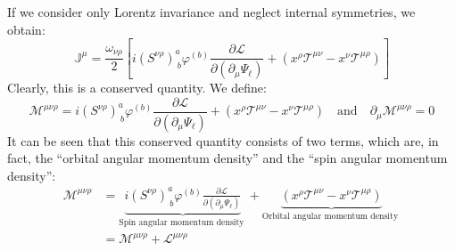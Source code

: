 \noindent
If we consider only Lorentz invariance and neglect internal symmetries, we obtain:
    \begin{equation}
    \mathbb{J}^\mu =
    \frac{\omega_{\nu\rho}}{2} \left[ i (S^{\nu\rho})^{a}_{\ b} \varphi ^{(b)}
    \frac{\partial \mathscr{L}}{\partial (\partial_\mu \Psi_\ell)} +
    \left( x^\rho \mathcal{T}^{\mu\nu} 
    - x^\nu \mathcal{T}^{\mu\rho} \right) \right]
  \end{equation}
Clearly, this is a conserved quantity. We define:
    \begin{equation}
    \mathcal{M}^{\mu\nu\rho} = i (S^{\nu\rho})^{a}_{\ b} \varphi ^{(b)}
    \frac{\partial \mathscr{L}}{\partial (\partial_\mu \Psi_\ell)} +
    \left( x^\rho \mathcal{T}^{\mu\nu}
    - x^\nu \mathcal{T}^{\mu\rho} \right) \quad \text{and} \quad
    \partial_\mu \mathcal{M}^{\mu\nu\rho} = 0
  \end{equation}
\noindent
It can be seen that this conserved quantity consists of two terms, which are, in fact, the “orbital angular momentum density” and the “spin angular momentum density”:
    \begin{equation}
    \begin{aligned}
          \mathcal{M}^{\mu\nu\rho}&
    = \underbrace{i (S^{\nu\rho})^{a}_{\ b} \varphi ^{(b)} 
    \frac{\partial \mathscr{L}}{\partial (\partial_\mu \Psi_\ell)}}_{\text{Spin angular momentum density } } 
    + \underbrace{\left( x^\rho \mathcal{T}^{\mu\nu} 
    - x^\nu \mathcal{T}^{\mu\rho} \right)}_{\text{Orbital angular momentum density } }\\
    &=\mathcal{M}^{\mu\nu\rho}+\mathscr{L}^{\mu\nu\rho}
    \end{aligned}
  \end{equation}

